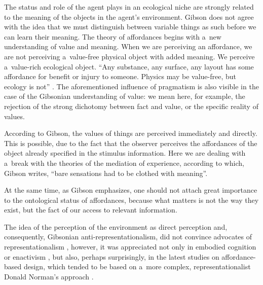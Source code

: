 \documentclass[%
manuscript=article,
year=2024,
volume=77,
doi=10.59203/zfn.77.693,
]{zfn}
\begin{document}
The status and role of the agent plays in an ecological niche are strongly related to the meaning of the objects in the agent's environment. Gibson does not agree with the idea that we must distinguish between variable things as such before we can learn their meaning. The theory of affordances begins with a~new understanding of value and meaning. When we are perceiving an affordance, we are not perceiving a~value-free physical object with added meaning. We perceive a~value-rich ecological object. ``Any substance, any surface, any layout has some affordance for benefit or injury to someone. Physics may be value-free, but ecology is not'' 
\parencite[][p.140]{gibson_ecological_1979}. %
 The aforementioned influence of pragmatism is also visible in the case of the Gibsonian understanding of value: we mean here, for example, the rejection of the strong dichotomy between fact and value, or the specific reality of values.



According to Gibson, the values of things are perceived immediately and directly. This is possible, due to the fact that the observer perceives the affordances of the object already specified in the stimulus information. Here we are dealing with a~break with the theories of the mediation of experience, according to which, Gibson 
\parencite*[][p.140]{gibson_ecological_1979} %
 writes, ``bare sensations had to be clothed with meaning''.



At the same time, as Gibson emphasizes, one should not attach great importance to the ontological status of affordances, because what matters is not the way they exist, but the fact of our access to relevant information.



The idea of the perception of the environment as direct perception and, consequently, Gibsonian anti-representationalism, did not convince advocates of representationalism 
\parencite[e.g.,][]{fodor_how_1981}, %
 however, it was appreciated not only in embodied cognition or enactivism 
\parencite[][]{herasescribano_philosophy_2019}, %
 but also, perhaps surprisingly, in the latest studies on affordance-based design, which tended to be based on a~more complex, representationalist Donald Norman's approach 
\parencite[see][]{masoudi_review_2019}.%
\end{document}
